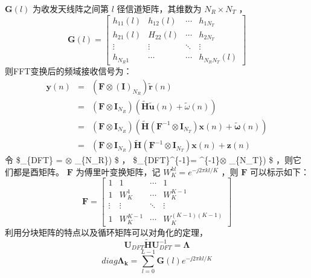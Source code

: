 \documentclass[10pt,a4paper,UTF8]{article}
\begin{document}
\(\pmb{ G}(l)\) 为收发天线阵之间第 \(l\) 径信道矩阵，其维数为 \(N_R\times N_T\) ，
\begin{equation}
  \label{eq:20120319gl}
  \pmb{G}(l) =
  \begin{bmatrix}
    h_{11}(l) & h_{12}(l) & \cdots & h_{1N_T} \\
    h_{21}(l) & H_{22}(l) & \cdots & h_{2N_T} \\
    \vdots  & \vdots     & \ddots  &\vdots   \\
    h_{N_R1} & \cdots & \cdots & h_{N_RN_T}(l)
  \end{bmatrix}
\end{equation}
则FFT变换后的频域接收信号为：
\begin{eqnarray}
  \label{eq:20120319yn}
  \pmb{y}(n) &=& (\pmb{F}\otimes \pmb{(I)}_{N_R}) \tilde{\pmb{r}}(n) \nonumber \\
                        &=& (\pmb{F}\otimes \pmb{I}_{N_R}) (\tilde{\pmb{H}}\tilde{\pmb{u}}(n) + \tilde{\omega} (n)) \nonumber \\
                        &=& (\pmb{F}\otimes \pmb{I}_{N_R}) (\tilde{\pmb{H}}(\pmb{F}^{-1} \otimes \pmb{I}_{N_T}) \pmb{x}(n) + \tilde{\pmb{\omega}}(n))   \nonumber \\
                        &=&  (\pmb{F}\otimes \pmb{I}_{N_R}) \tilde{\pmb{H}}(\pmb{F}^{-1} \otimes \pmb{I}_{N_T}) \pmb{x}(n) + \pmb{z}(n)
\end{eqnarray}
令 \$\_\{DFT\} = \(\otimes\) \_\{N\_R\}) \$ ， \$\_\{DFT\}\^{}\{-1\}= \^{}\{-1\}\(\otimes\) \_\{N\_T\}) \$ ，则它们都是酉矩阵。 \(\pmb{F}\) 为傅里叶变换矩阵，记 \(W_{K}^{kl} = e^{-j2\pi kl/K}\) ，则 \(\pmb{F}\) 可以标示如下：
\begin{equation}
  \label{eq:20120319f}
  \pmb{F} =
  \begin{bmatrix}
  1&  1                &    \cdots  &  1 \\
  1&  W_{K}^1     &     \cdots &  W_{K}^{K-1}  \\
   \vdots & \vdots & \ddots & \vdots \\
   1& W_{K}^{K-1}  & \cdots  &   W_{K}^{(K-1)(K-1)}
  \end{bmatrix}
\end{equation}
利用分块矩阵的特点以及循环矩阵可以对角化的定理，
\begin{equation}
  \label{eq:20120319uhu}
  \pmb{U}_{DFT} \tilde{\pmb{H}} \pmb{U}_{DFT}^{-1} = \pmb{\Lambda}
\end{equation}
\begin{equation}
  \label{eq:20120319diag}
  diag{\pmb{\Lambda_{k}}} = \sum_{l=0}^{L-1} \pmb{G}(l) e^{-j2\pi kl/K}
\end{equation}
\end{document}
